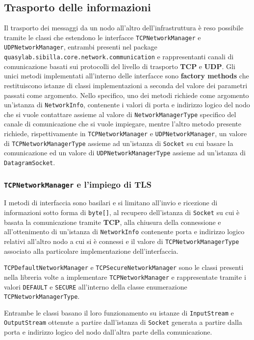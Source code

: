 \subsection{Trasporto delle informazioni}
Il trasporto dei messaggi da un nodo all'altro dell'infrastruttura è reso possibile tramite le classi che estendono le interfacce
\texttt{TCPNetworkManager} e \texttt{UDPNetworkManager}, entrambi presenti nel package \texttt{quasylab.sibilla.core.network.communication} e rappresentanti canali di comunicazione basati sui protocolli
del livello di trasporto \textbf{TCP} e \textbf{UDP}.
Gli unici metodi implementati all'interno delle interfacce sono \textbf{factory methods} che restituiscono istanze di classi implementazioni a seconda del valore dei parametri passati come argomento.
Nello specifico, uno dei metodi richiede come argomento un'istanza di \texttt{NetworkInfo}, contenente
i valori di porta e indirizzo logico del nodo che si vuole contattare assieme al valore di \texttt{NetworkManagerType} specifico del canale di comunicazione che si vuole impiegare, mentre l'altro metodo presente
richiede, rispettivamente in \texttt{TCPNetworkManager} e \texttt{UDPNetworkManager}, un valore di \texttt{TCPNetworkManagerType} assieme ad un'istanza di \texttt{Socket} su cui basare la comunicazione ed un
valore di \texttt{UDPNetworkManagerType} assieme ad un'istanza di \texttt{DatagramSocket}.

\subsubsection{\texttt{TCPNetworkManager} e l'impiego di TLS}
I metodi di interfaccia sono basilari e si limitano all'invio e ricezione di informazioni sotto forma di \texttt{byte[]}, al recupero dell'istanza di \texttt{Socket} su cui è basata la comunicazione tramite \textbf{TCP},
alla chiusura della connessione e all'ottenimento di un'istanza di \texttt{NetworkInfo} contenente porta e indirizzo logico relativi all'altro nodo a cui si è connessi e il valore di \texttt{TCPNetworkManagerType} associato alla particolare implementazione dell'interfaccia.

\texttt{TCPDefaultNetworkManager} e \texttt{TCPSecureNetworkManager} sono le classi presenti nella libreria volte a implementare \texttt{TCPNetworkManager} e rappresentate tramite i valori
\texttt{DEFAULT} e \texttt{SECURE} all'interno della classe enumerazione \texttt{TCPNetworkManagerType}.

Entrambe le classi basano il loro funzionamento su istanze di \texttt{InputStream} e \texttt{OutputStream} ottenute a partire dall'istanza di \texttt{Socket} generata a partire dalla porta e indirizzo logico del nodo dall'altra parte della comunicazione.

